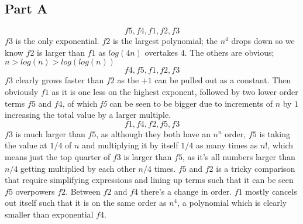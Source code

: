 \documentclass[12pt,twoside]{article}
\begin{document}

\begin{problems}

\section*{Part A}

\problem  %

\begin{problemparts}

\problempart  %
\[
f5, f4, f1, f2, f3
\]
\newline
$f3$ is the only exponential. $f2$ is the largest polynomial; the $n^{4}$ drops down so we know $f2$ is larger than $f1$ as $log(4n)$ overtakes $4$. The others are obvious; $n > log(n) > log(log(n))$
\newline
\problempart  %
\[
f4, f5, f1, f2, f3
\]
\newline
$f3$ clearly grows faster than $f2$ as the $+1$ can be pulled out as a constant. Then obviously  $f1$ as it is one less on the highest exponent, followed by two lower order terms $f5$ and $f4$, of which {\em f5} can be seen to be bigger due to increments of $n$ by $1$ increasing the total value by a larger multiple.  
\newline
\problempart  %
\[
f1, f4, f2, f5, f3
\]
\newline
$f3$ is much larger than $f5$, as although they both have an $n^{n}$ order, $f5$ is taking the value at $1/4$ of $n$ and multiplying it by itself $1/4$ as many times as $n!$, which means just the top quarter of $f3$ is larger than $f5$, as it's all numbers larger than $n/4$ getting multiplied by each other $n/4$ times. $f5$ and $f2$ is a tricky comparison that require simplifying expressions and lining up terms such that it can be seen $f5$ overpowers $f2$. Between $f2$ and $f4$ there's a change in order. $f1$ mostly cancels out itself such that it is on the same order as $n^{4}$, a polynomial which is clearly smaller than exponential $f4$.
\newline
\end{problemparts}


\end{problems}
\end{document}

